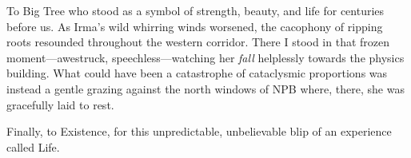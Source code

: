 To Big Tree who stood as a symbol of strength, beauty, and life for centuries before us.
As Irma's wild whirring winds worsened, the cacophony of ripping roots resounded throughout the western corridor.
There I stood in that frozen moment---awestruck, speechless---watching her \emph{fall} helplessly towards the physics building.
What could have been a catastrophe of cataclysmic proportions was instead a gentle grazing against the north windows of NPB where, there, she was gracefully laid to rest.

Finally, to Existence, for this unpredictable, unbelievable blip of an experience called Life.
